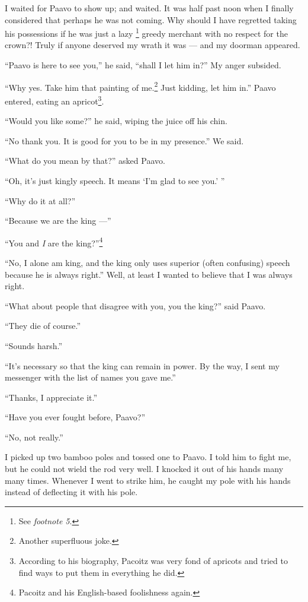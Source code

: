 I waited for Paavo to show up; and waited.
It was half past noon when I finally considered that perhaps he was not coming.
Why should I have regretted taking his possessions if he was just a lazy
\footnote{See \emph{footnote 5}.} greedy merchant with no respect for the crown?!
Truly if anyone deserved my wrath it was --- and my doorman appeared.

``Paavo is here to see you,'' he said, ``shall I let him in?'' My anger subsided.

``Why yes. Take him that painting of me.\footnote{Another superfluous joke.} Just kidding, let him in.'' Paavo entered, eating an apricot\footnote{According to his biography, Pacoitz was very fond of apricots and tried to find ways to put them in everything he did.}.

``Would you like some?'' he said, wiping the juice off his chin.

``No thank you. It is good for you to be in my presence.'' We said.

``What do you mean by that?'' asked Paavo.

``Oh, it's just kingly speech. It means `I'm glad to see you.' ''

``Why do it at all?''

``Because we are the king ---''

``You and \emph{I} are the king?''\footnote{Pacoitz and his English-based foolishness again.}

``No, I alone am king, and the king only uses superior (often confusing) speech because he is always right.'' Well, at least I wanted to believe that I was always right.

``What about people that disagree with you, you the king?'' said Paavo.

``They die of course.''

``Sounds harsh.''

``It's necessary so that the king can remain in power. By the way, I sent my messenger with the list of names you gave me.''

``Thanks, I appreciate it.''

``Have you ever fought before, Paavo?''

``No, not really.''

I picked up two bamboo poles and tossed one to Paavo. I told him to fight me, but he could not wield the rod very well. I knocked it out of his hands many many times. Whenever I went to strike him, he caught my pole with his hands instead of deflecting it with his pole.

